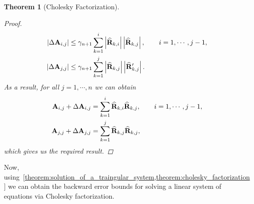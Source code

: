 \documentclass[11pt,draft]{article}
\newcommand{\mat}[1]{\mathbf{\MakeUppercase{#1}}}
\newtheorem{theorem}{Theorem}[section]
\theoremstyle{definition}
\theoremstyle{remark}
\newcommand{\abs}[1]{\left|#1\right|}
\begin{document}
\begin{theorem}[Cholesky Factorization]
\begin{proof}
    \begin{align}
        \abs{\Delta \mat{a}_{i,j}} &\leq \gamma_{n+1} \sum_{k=1}^{i} \abs{\widehat{\mat{r}}_{k,i}} \abs{\widehat{\mat{r}}_{k,j}}, \qquad i = 1, \cdots, j - 1,\\
        \abs{\Delta \mat{a}_{j,j}} &\leq \gamma_{n+1}\sum_{k=1}^{j}  \abs{\widehat{\mat{r}}_{k,j}} \abs{\widehat{\mat{r}}_{k,j}^{\prime}}.
    \end{align}
    As a result, for all $j=1,\cdots, n$ we can obtain
    \begin{align}
        \mat{a}_{i,j} + \Delta \mat{a}_{i,j} &= \sum_{k=1}^{i} \widehat{\mat{r}}_{k,i} \widehat{\mat{r}}_{k,j}, \qquad i = 1, \cdots, j - 1,\\ 
        \mat{a}_{j,j} + \Delta \mat{a}_{j,j} &=  \sum_{k=1}^{j}  \widehat{\mat{r}}_{k,j}\widehat{\mat{r}}_{k,j},
    \end{align}
    which gives us the required result.
\end{proof}
    
\end{theorem}


Now, using~\cref{theorem:solution_of_a_traingular_system,theorem:cholesky_factorization} we can obtain the backward error bounds for solving a linear system of equations via Cholesky factorization.
\end{document}
